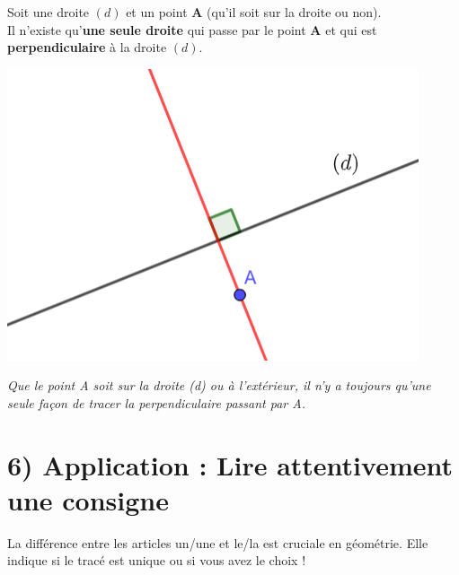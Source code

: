 \begin{proprietebox}
Soit une droite $(d)$ et un point \textbf{A} (qu'il soit sur la droite ou non).\\
Il n'existe qu'\textbf{une seule droite} qui passe par le point \textbf{A} et qui est \textbf{perpendiculaire} à la droite $(d)$.

\vspace{0.5cm}

\begin{center}
	\includegraphics[width=0.5\linewidth]{../../assets/images/6e/seq_02/point_droite_perpendiculaire}
\end{center}
\vspace{0.5cm}

\textit{Que le point A soit sur la droite (d) ou à l'extérieur, il n'y a toujours qu'une seule façon de tracer la perpendiculaire passant par A.}
\end{proprietebox}

\section*{6) Application : Lire attentivement une consigne}

\noindent
La différence entre les articles \og un/une \fg{} et \og le/la \fg{} est cruciale en géométrie. 
Elle indique si le tracé est unique ou si vous avez le choix !

\vspace{0.5cm} %

